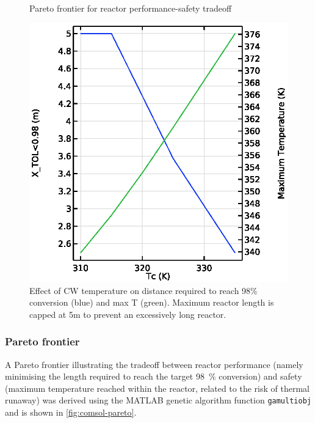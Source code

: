 \begin{figure}[h]
\begin{minipage}[t]{0.32\linewidth}
        \caption{Pareto frontier for reactor performance-safety tradeoff}
        \label{fig:comsol-pareto}
    \end{minipage}
    \begin{minipage}[t]{0.32\linewidth}
        \includegraphics[width=\linewidth]{figures/S4-CW-X-T.eps}
        \caption{Effect of CW temperature on distance required to reach 98\% conversion (blue) and max T (green). Maximum reactor length is capped at 5m to prevent an excessively long reactor.}
        \label{fig:comsol-S4-CW-X-T}
    \end{minipage}
\end{figure}

\subsubsection{Pareto frontier}
A Pareto frontier illustrating the tradeoff between reactor performance (namely minimising the length required to reach the target \SI{98}{\percent} conversion) and safety (maximum temperature reached within the reactor, related to the risk of thermal runaway) was derived using the MATLAB genetic algorithm function \texttt{gamultiobj} and is shown in \cref{fig:comsol-pareto}.

